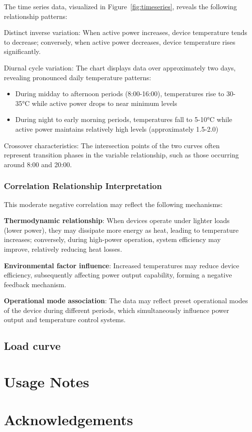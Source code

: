 \documentclass[12pt]{article}
\begin{document}
The time series data, visualized in Figure~\ref{fig:timeseries}, reveals the following relationship patterns:

Distinct inverse variation: When active power increases, device temperature tends to decrease; conversely, when active power decreases, device temperature rises significantly.

Diurnal cycle variation: The chart displays data over approximately two days, revealing pronounced daily temperature patterns:
\begin{itemize}
    \item During midday to afternoon periods (8:00-16:00), temperatures rise to 30-35°C while active power drops to near minimum levels
    \item During night to early morning periods, temperatures fall to 5-10°C while active power maintains relatively high levels (approximately 1.5-2.0)
\end{itemize}

Crossover characteristics: The intersection points of the two curves often represent transition phases in the variable relationship, such as those occurring around 8:00 and 20:00.

\subsubsection*{Correlation Relationship Interpretation}

This moderate negative correlation may reflect the following mechanisms:

\textbf{Thermodynamic relationship}: When devices operate under lighter loads (lower power), they may dissipate more energy as heat, leading to temperature increases; conversely, during high-power operation, system efficiency may improve, relatively reducing heat losses.

\textbf{Environmental factor influence}: Increased temperatures may reduce device efficiency, subsequently affecting power output capability, forming a negative feedback mechanism.

\textbf{Operational mode association}: The data may reflect preset operational modes of the device during different periods, which simultaneously influence power output and temperature control systems.

\subsection*{Load curve}

\section*{Usage Notes}

\section*{Acknowledgements}

\end{document}
